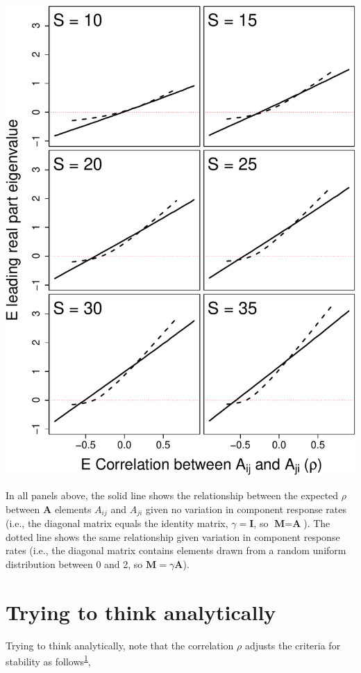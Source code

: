 \documentclass[]{article}
\begin{document}
\includegraphics{revision_notes_files/figure-latex/unnamed-chunk-10-1.pdf}

In all panels above, the solid line shows the relationship between the
expected \(\rho\) between \(\textbf{A}\) elements \(A_{ij}\) and
\(A_{ji}\) given no variation in component response rates (i.e., the
diagonal matrix equals the identity matrix, \(\gamma = \textbf{I}\), so
\(\textbf{M} = \textbf{A}\)). The dotted line shows the same
relationship given variation in component response rates (i.e., the
diagonal matrix contains elements drawn from a random uniform
distribution between 0 and 2, so \(\textbf{M} = \gamma\textbf{A}\)).

\section{Trying to think
analytically}\label{trying-to-think-analytically}

Trying to think analytically, note that the correlation \(\rho\) adjusts
the criteria for stability as
follows\textsuperscript{\protect\hyperlink{ref-Allesina2015a}{1}},
\end{document}
